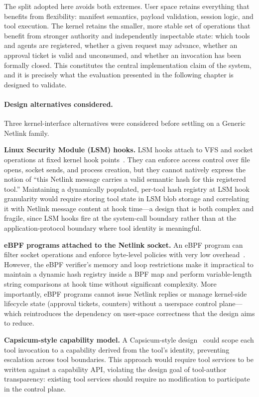 The split adopted here avoids both extremes.
User space retains everything that benefits from flexibility: manifest semantics, payload validation, session logic, and tool execution.
The kernel retains the smaller, more stable set of operations that benefit from stronger authority and independently inspectable state: which tools and agents are registered, whether a given request may advance, whether an approval ticket is valid and unconsumed, and whether an invocation has been formally closed.
This constitutes the central implementation claim of the system, and it is precisely what the evaluation presented in the following chapter is designed to validate.

\paragraph{Design alternatives considered.}
\label{sec:design-alternatives}

Three kernel-interface alternatives were considered before settling on a Generic Netlink family.

\textbf{Linux Security Module (LSM) hooks.}
LSM hooks attach to VFS and socket operations at fixed kernel hook points~\cite{lsm2026}.
They can enforce access control over file opens, socket sends, and process creation, but they cannot natively express the notion of ``this Netlink message carries a valid semantic hash for this registered tool.''
Maintaining a dynamically populated, per-tool hash registry at LSM hook granularity would require storing tool state in LSM blob storage and correlating it with Netlink message content at hook time---a design that is both complex and fragile, since LSM hooks fire at the system-call boundary rather than at the application-protocol boundary where tool identity is meaningful.

\textbf{eBPF programs attached to the Netlink socket.}
An eBPF program can filter socket operations and enforce byte-level policies with very low overhead~\cite{seccomp2026}.
However, the eBPF verifier's memory and loop restrictions make it impractical to maintain a dynamic hash registry inside a BPF map and perform variable-length string comparisons at hook time without significant complexity.
More importantly, eBPF programs cannot issue Netlink replies or manage kernel-side lifecycle state (approval tickets, counters) without a userspace control plane---which reintroduces the dependency on user-space correctness that the design aims to reduce.

\textbf{Capsicum-style capability model.}
A Capsicum-style design~\cite{watson2010capsicum} could scope each tool invocation to a capability derived from the tool's identity, preventing escalation across tool boundaries.
This approach would require tool services to be written against a capability API, violating the design goal of tool-author transparency: existing tool services should require no modification to participate in the control plane.

